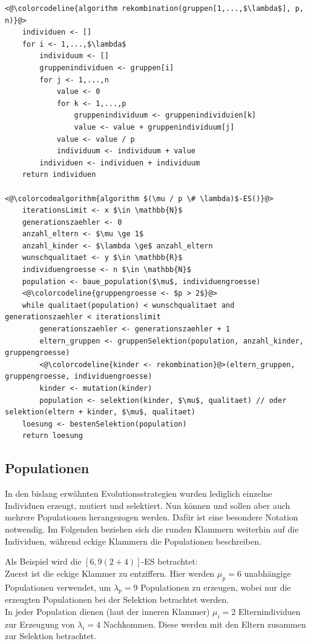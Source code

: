\begin{lstlisting}[caption={$(\mu / p \# \lambda)$-Evolutionsstrategie mit $p > 2$}, firstnumber=1, captionpos=b, label=lst:mu_pgt2_lambda_es]
<@\colorcodeline{algorithm rekombination(gruppen[1,...,$\lambda$], p, n)}@>
	individuen <- []
	for i <- 1,...,$\lambda$
		individuum <- []
		gruppenindividuen <- gruppen[i]
		for j <- 1,...,n
			value <- 0
			for k <- 1,...,p
				gruppenindividuum <- gruppenindividuien[k]
				value <- value + gruppenindividuum[j]
			value <- value / p
			individuum <- individuum + value
		individuen <- individuen + individuum
	return individuen

<@\colorcodealgorithm{algorithm $(\mu / p \# \lambda)$-ES()}@>
	iterationsLimit <- x $\in \mathbb{N}$
	generationszaehler <- 0
	anzahl_eltern <- $\mu \ge 1$
	anzahl_kinder <- $\lambda \ge$ anzahl_eltern
	wunschqualitaet <- y $\in \mathbb{R}$
	individuengroesse <- n $\in \mathbb{N}$
	population <- baue_population($\mu$, individuengroesse)
	<@\colorcodeline{gruppengroesse <- $p > 2$}@>
	while qualitaet(population) < wunschqualitaet and generationszaehler < iterationslimit
		generationszaehler <- generationszaehler + 1
		eltern_gruppen <- gruppenSelektion(population, anzahl_kinder, gruppengroesse)
		<@\colorcodeline{kinder <- rekombination}@>(eltern_gruppen, gruppengroesse, individuengroesse)
		kinder <- mutation(kinder)
		population <- selektion(kinder, $\mu$, qualitaet) // oder selektion(eltern + kinder, $\mu$, qualitaet)
	loesung <- bestenSelektion(population)
	return loesung
\end{lstlisting}

\subsection{Populationen}

In den bislang erwähnten Evolutionsstrategien wurden lediglich einzelne Individuen erzeugt, mutiert und selektiert.
Nun können und sollen aber auch mehrere Populationen herangezogen werden.
Dafür ist eine besondere Notation notwendig.
Im Folgenden beziehen sich die runden Klammern weiterhin auf die Individuen, während eckige Klammern die Populationen beschreiben.

Als Beispiel wird die $[6,9(2+4)]$-ES betrachtet:\\
Zuerst ist die eckige Klammer zu entziffern. Hier werden $\mu_p = 6$ unabhängige Populationen verwendet, um  $\lambda_p = 9$ Populationen zu erzeugen, wobei nur die erzeugten Populationen bei der Selektion betrachtet werden.\\
In jeder Population dienen (laut der inneren Klammer) $\mu_i = 2$ Elternindividuen zur Erzeugung von $\lambda_i = 4$ Nachkommen. Diese werden mit den Eltern zusammen zur Selektion betrachtet.

